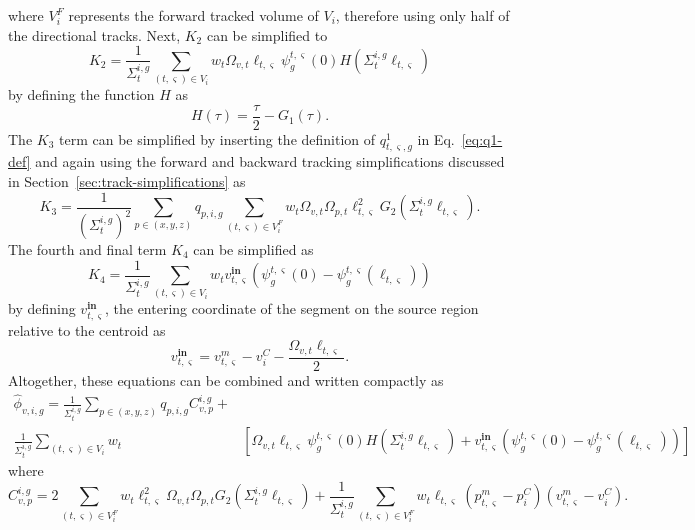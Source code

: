 where $V^F_i$ represents the forward tracked volume of $V_i$, therefore using only half of the directional tracks. Next, $K_2$ can be simplified to
\begin{equation}
K_2 = \frac{1}{\Sigma_{t}^{i,g}} \sum_{(t,\varsigma) \in V_i} w_t \Omega_{v,t} \ell_{t,\varsigma} \psi^{t,\varsigma}_g(0) H(\Sigma_{t}^{i,g} \ell_{t,\varsigma})
\end{equation}
by defining the function $H$ as
\begin{equation}
H(\tau) = \frac{\tau}{2} - G_1(\tau).
\label{eq:h}
\end{equation}
The $K_3$ term can be simplified by inserting the definition of $q^1_{t,\varsigma,g}$ in Eq.~\ref{eq:q1-def} and again using the forward and backward tracking simplifications discussed in Section~\ref{sec:track-simplifications} as
\begin{equation}
K_3 = \frac{1}{\left(\Sigma_{t}^{i,g}\right)^2} \sum_{p \in (x,y,z)} q_{p,i,g} \sum_{(t,\varsigma) \in V^F_i} w_t \Omega_{v,t} \Omega_{p,t} \ell_{t,\varsigma}^2 G_2(\Sigma_{t}^{i,g} \ell_{t,\varsigma}).
\end{equation}
The fourth and final term $K_4$ can be simplified as
\begin{equation}
K_4 = \frac{1}{\Sigma_{t}^{i,g}} \sum_{(t,\varsigma) \in V_i} w_t v^{\textbf{in}}_{t,\varsigma} \left(\psi^{t,\varsigma}_g(0) - \psi^{t,\varsigma}_g(\ell_{t,\varsigma}) \right)
\end{equation}
by defining $v^{\textbf{in}}_{t,\varsigma}$, the entering coordinate of the segment on the source region relative to the centroid as
\begin{equation}
v^{\textbf{in}}_{t,\varsigma} = v^m_{t,\varsigma} - v^C_i - \frac{\Omega_{v,t} \ell_{t,\varsigma}}{2}.
\end{equation}
Altogether, these equations can be combined and written compactly as
\begin{equation}
\begin{split}
\hat{\phi}_{v,i,g} = \frac{1}{\Sigma_{t}^{i,g}} \sum_{p \in (x,y,z)} q_{p,i,g} C_{v,p}^{i,g} + & \\
\frac{1}{\Sigma_{t}^{i,g}} \sum_{(t,\varsigma) \in V_i} w_t & \left[\Omega_{v,t} \ell_{t,\varsigma} \psi^{t,\varsigma}_g(0) H(\Sigma_{t}^{i,g} \ell_{t,\varsigma}) + v^{\textbf{in}}_{t,\varsigma} \left(\psi^{t,\varsigma}_g(0) - \psi^{t,\varsigma}_g(\ell_{t,\varsigma}) \right)\right]
\end{split}
\label{eq:final-scalar-flux-moments}
\end{equation}
where
\begin{equation}
C_{v,p}^{i,g} =  2 \sum_{(t,\varsigma) \in V^F_i} w_t \ell_{t,\varsigma}^2 \Omega_{v,t} \Omega_{p,t} G_2(\Sigma_{t}^{i,g} \ell_{t,\varsigma}) + \frac{1}{\Sigma_{t}^{i,g}} \sum_{(t,\varsigma) \in V^F_i} w_t \ell_{t,\varsigma} \left( p^m_{t,\varsigma} - p^C_i \right) \left(v^m_{t,\varsigma} - v^C_i\right).
\label{eq:ls-C}
\end{equation}

